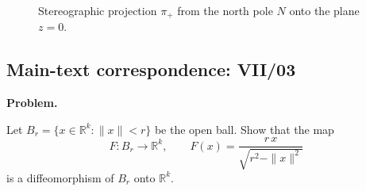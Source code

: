 \begin{solution}
\begin{enumerate}[label=\textnormal{(\alph*)}]
\begin{figure}[htbp]
		\caption{Stereographic projection $\pi_+$ from the north pole $N$ onto the plane $z=0$.}
		\label{fig:stereographic-tikz}
	\end{figure}
\end{enumerate}
\end{solution}

\subsection*{Main-text correspondence: VII/03}

\begin{problem}
\label{prob:cp-vii-0010}
\par\medskip\noindent\textbf{Problem.}\par\smallskip

Let $B_r=\{x\in\mathbb{R}^k:\|x\|<r\}$ be the open ball. Show that the map
\[
F:B_r\longrightarrow \mathbb{R}^k,\qquad
F(x)=\frac{r\,x}{\sqrt{r^2-\|x\|^2}}
\]
is a diffeomorphism of $B_r$ onto $\mathbb{R}^k$.
\end{problem}

